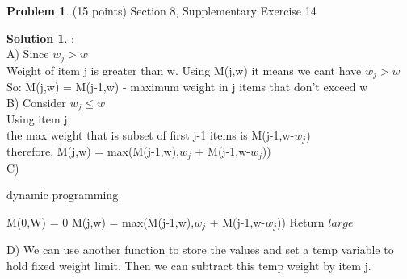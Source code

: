 \documentclass{article}
\theoremstyle{definition}
\newtheorem{problem}{Problem}
\newtheorem*{solution}{Solution}
\begin{document}
\newpage

\begin{problem} (15 points) Section 8, Supplementary Exercise 14
\end{problem}
\begin{solution} :
\\
A) Since $w_j > w$
\\
Weight of item j is greater than w. Using M(j,w) it means we cant have $w_j > w$
\\
So: M(j,w) = M(j-1,w) - maximum weight in j items that don't exceed w
\\

B) Consider $w_j \leq w$
\\
Using item j:
\\
the max weight that is subset of first j-1 items is M(j-1,w-$w_j$)
\\
therefore, M(j,w) = max(M(j-1,w),$w_j$ + M(j-1,w-$w_j$))
\\

C)
\begin{algorithm}
\caption{dynamic programming}
\label{}
\begin{algorithmic}[1]
    \State M(0,W) = 0
    \EndFor
        M(j,w) = max(M(j-1,w),$w_j$ + M(j-1,w-$w_j$))
        \Else \State Return $large$
        \EndIf
        \EndFor
        \EndFor
\EndProcedure
\end{algorithmic}
\end{algorithm}



D) We can use another function to store the values and set a temp variable to hold fixed weight limit. Then we can subtract this temp weight by item j.

\end{solution}

\newpage
\end{document}
